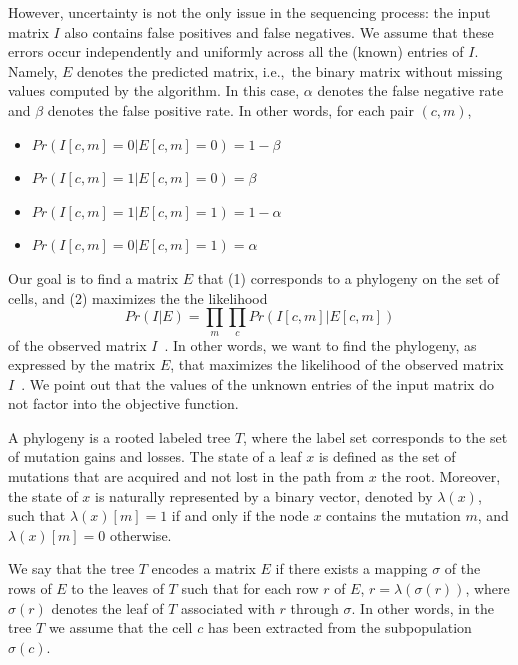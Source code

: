 \documentclass[a4paper,USenglish]{article}
\newcommand{\ie}{i.e.,~}
\theoremstyle{definition}
\begin{document}
However, uncertainty is not the only issue in the sequencing process:
the input matrix $I$ also contains false positives and false negatives. 
We assume that these errors occur independently and uniformly across 
all the (known) entries of $I$. 
Namely, $E$ denotes the predicted matrix, \ie the binary matrix without
missing values computed by the algorithm.
In this case,
$\alpha$ denotes the false negative rate and $\beta$ denotes the false positive rate.
In other words, for each pair $(c,m)$, 
\begin{itemize}
    \item $Pr(I[c,m] = 0|E[c,m] = 0) = 1- \beta$
    \item $Pr(I[c,m] = 1|E[c,m] = 0) = \beta$
    \item $Pr(I[c,m] = 1|E[c,m] = 1) = 1- \alpha$
    \item $Pr(I[c,m] = 0|E[c,m] = 1) = \alpha$
\end{itemize}

Our goal is to find a matrix $E$ that (1) corresponds to a phylogeny on the set of cells,
and (2) maximizes the the likelihood 
$$
Pr(I|E) = \prod_{m} \prod_{c} Pr(I[c,m] | E[c,m])
$$
of the observed matrix $I$~\cite{Jahn2016}.
In other words, we want to find the phylogeny, as expressed by the matrix $E$, that
maximizes the likelihood of the observed matrix $I$~\cite{Jahn2016}.
We point out that the values of the unknown entries of the input matrix 
do not factor into the objective function.


A phylogeny is a rooted labeled tree $T$, where the label set corresponds to the set of
mutation gains and losses.
The state of a leaf $x$ is defined as the set of mutations that are acquired and not lost in the path from $x$ the root.
Moreover, the state of $x$ is naturally
represented by a binary vector, denoted by $\lambda(x)$, such that $\lambda(x)[m]=1$ if and
only if the node $x$ contains the mutation $m$, and $\lambda(x)[m]=0$ otherwise.

We say that the tree $T$ encodes a matrix $E$ 
if there exists a mapping $\sigma$ of the rows  of $E$
to the leaves of $T$ such that for each row $r$ of $E$, $r=\lambda(\sigma(r))$,
where $\sigma(r)$ denotes the leaf of $T$ associated with $r$ through $\sigma$.
In other words, in the tree $T$ we assume that the cell $c$ has been extracted from the
subpopulation $\sigma(c)$.
\end{document}

